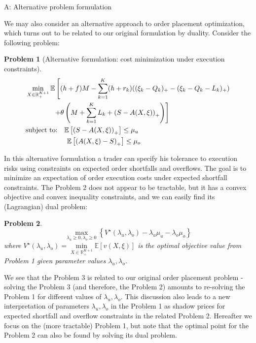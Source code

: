 \documentclass[opre,nonblindrev]{informs3}
\newtheorem{myproblem}{Problem}
\begin{document}
\begin{APPENDIX}{A: Alternative problem formulation}

\noindent We may also consider an alternative approach to order placement optimization, which turns out to be related to our original formulation by duality. Consider the following problem:
\begin{myproblem}[Alternative formulation: cost minimization under execution constraints]
\begin{align}
&\min_{X\in\mathbb{R}^{K+1}_+}\mathbb{E}\left[(h+f)M -\sum_{k=1}^K(h+r_k)((\xi_k-Q_k)_+-(\xi_k-Q_k-L_k)_+)\right. \notag\\ &\qquad\qquad\left.+\theta\left(M+\sum_{k=1}^KL_k+\left(S - A(X,\xi)\right)_+\right)\right]\label{optim.set.constr}\\
&\text{subject to:}\quad\mathbb{E}\left[\left(S - A(X,\xi)\right)_+\right]\leq\mu_u \label{optim.constr.1}\\
&\hskip 60pt \mathbb{E}\left[\left(A(X,\xi) - S\right)_+\right]\leq\mu_o
\label{optim.constr.2}
\end{align}
\end{myproblem}

\noindent In this alternative formulation a trader can specify his tolerance to execution risks using constraints on expected order shortfalls and overflows. The goal is to minimize an expectation of order execution costs under expected shortfall constraints. The Problem 2 does not appear to be tractable, but it has a convex objective and convex inequality constraints, and we can easily find its (Lagrangian) dual problem:

\begin{myproblem}
\begin{equation}\label{optim.set.dual}
\max_{\lambda_u\geq 0,\lambda_o\geq 0}\left\{V^\star(\lambda_u,\lambda_o)-\lambda_u\mu_u-\lambda_o\mu_o\right\}
\end{equation}
where $V^\star(\lambda_u,\lambda_o) = \underset{X\in\mathbb{R}^{K+1}_+}{\min}\mathbb{E}[v(X,\xi)]$ is the optimal objective value from Problem 1 given parameter values $\lambda_u,\lambda_o$.
\end{myproblem}

\noindent We see that the Problem 3 is related to our original order placement problem - solving the Problem 3 (and therefore, the Problem 2) amounts to re-solving the Problem 1 for different values of $\lambda_u,\lambda_o$. This discussion also leads to a new interpretation of parameters $\lambda_u,\lambda_o$ in the Problem 1 as shadow prices for expected shortfall and overflow constraints in the related Problem 2. Hereafter we focus on the (more tractable) Problem 1, but note that the optimal point for the Problem 2 can also be found by solving its dual problem.

\end{APPENDIX}
\end{document}

